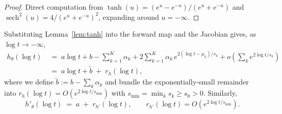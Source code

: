 \begin{proof}
Direct computation from $\tanh(u) = (e^{u} - e^{-u}) / (e^{u} + e^{-u})$
and $\operatorname{sech}^2(u) = 4 / (e^u + e^{-u})^2$, expanding around
$u = -\infty$.
\end{proof}

Substituting Lemma~\ref{lem:tanh} into the forward map and the Jacobian
gives, as $\log t \to -\infty$,
\begin{align}
    h_\theta(\log t)
    &\;=\; a \log t + b - \sum_{k=1}^{K} \alpha_k
        + 2 \sum_{k=1}^{K} \alpha_k \, e^{2 (\log t - \mu_k)/s_k}
        + o\!\left(\sum_k e^{2 \log t / s_k}\right) \nonumber \\
    &\;=\; a \log t + \widetilde{b} \;+\; r_h(\log t),
    \label{eq:app-h-asymp}
\end{align}
where we define
$\widetilde{b} := b - \sum_k \alpha_k$ and bundle the exponentially-small
remainder into $r_h(\log t) = O(e^{2 \log t / s_{\min}})$ with
$s_{\min} = \min_k s_k \ge s_0 > 0$. Similarly,
\begin{equation}
    h'_\theta(\log t) \;=\; a \;+\; r_{h'}(\log t),
    \qquad
    r_{h'}(\log t) = O(e^{2 \log t / s_{\min}}).
    \label{eq:app-hprime-asymp}
\end{equation}

